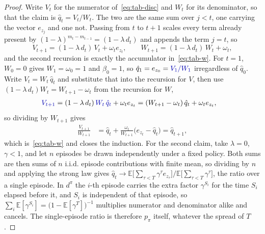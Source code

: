 \documentclass[11pt]{article}
\theoremstyle{remark}
\newcommand{\E}{\mathbb E}
\newcommand{\1}{\mathds{1}}
\newcommand{\occ}{d^{\pi}}
\newcommand{\pz}{p_{\pi}}
\newcommand{\new}[1]{\textcolor{blue!70!black}{#1}}
\begin{document}
\begin{proof}
\new{Write $V_t$ for the numerator of~\eqref{eq:tab-disc} and $W_t$ for its denominator, so that the claim is $\hat q_t=V_t/W_t$.
The two are the same sum over $j<t$, one carrying the vector $e_{z_j}$ and one not.
Passing from $t$ to $t+1$ scales every term already present by $(1-\lambda)^{m_t-m_{t-1}}=(1-\lambda\,d_t)$ and appends the term $j=t$, so
\begin{equation*}
  V_{t+1}=(1-\lambda\,d_t)\,V_t+\omega_t e_{z_t},
  \qquad
  W_{t+1}=(1-\lambda\,d_t)\,W_t+\omega_t ,
\end{equation*}
and the second recursion is exactly the accumulator in~\eqref{eq:tab-w}.}
For $t=1$, $W_0=0$ gives $W_1=\omega_0=1$ and $\beta_0=1$, so $\hat q_1=e_{z_0}=\new{V_1/W_1}$ irregardless of $\hat q_0$.
\new{Write $V_t=W_t\,\hat q_t$ and substitute that into the recursion for $V$, then use $(1-\lambda\,d_t)W_t=W_{t+1}-\omega_t$ from the recursion for $W$,}
\begin{align*}
  \new{V_{t+1}}
  &=(1-\lambda\,d_t)\,\new{W_t\,\hat q_t}+\omega_t e_{z_t}
  =(W_{t+1}-\omega_t)\,\hat q_t+\omega_t e_{z_t} ,
\end{align*}
\new{so dividing by $W_{t+1}$ gives}
\begin{align*}
  \frac{V_{t+1}}{W_{t+1}}
  &=\hat q_t+\frac{\omega_t}{W_{t+1}}\big(e_{z_t}-\hat q_t\big)
  =\hat q_{t+1} ,
\end{align*}
\new{which is~\eqref{eq:tab-w} and closes the induction.}
\new{For the second claim, take $\lambda=0$, \new{$\gamma<1$}, and let $n$ episodes be drawn independently under a fixed policy.
Both sums are then sums of $n$ i.i.d. episode contributions with finite mean, so dividing by $n$ and applying the strong law gives $\hat q_t\to\E\big[\sum_{\tau<T}\gamma^{\tau}e_{z_\tau}\big]\big/\E\big[\sum_{\tau<T}\gamma^{\tau}\big]$, the ratio over a single episode.
In $\occ$ the $i$-th episode carries the extra factor $\gamma^{S_i}$ for the time $S_i$ elapsed before it, and $S_i$ is independent of that episode, so $\sum_i\E[\gamma^{S_i}]=\big(1-\E[\gamma^{T}]\big)^{-1}$ multiplies numerator and denominator alike and cancels.
The single-episode ratio is therefore $\pz$ itself, whatever the spread of $T$.} \qedhere
\end{proof}
\end{document}
